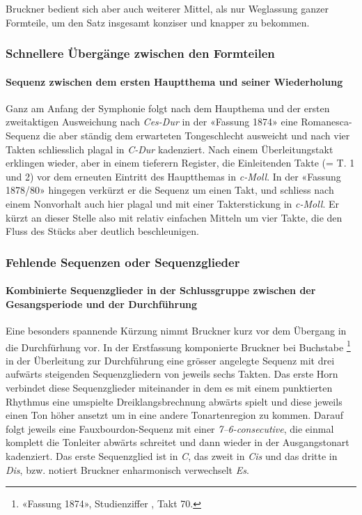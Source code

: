 Bruckner bedient sich aber auch weiterer Mittel, als nur Weglassung ganzer Formteile, um den Satz insgesamt konziser und knapper zu bekommen.

\subsubsection{Schnellere Übergänge zwischen den Formteilen}

\paragraph{Sequenz zwischen dem ersten Hauptthema und seiner Wiederholung}

Ganz am Anfang der Symphonie folgt nach dem Haupthema und der ersten zweitaktigen Ausweichung nach \emph{Ces-Dur} in der «Fassung 1874» eine Romanesca-Sequenz die aber ständig dem erwarteten Tongeschlecht ausweicht und nach vier Takten schliesslich plagal in \emph{C-Dur} kadenziert.
Nach einem Überleitungstakt erklingen wieder, aber in einem tieferern Register, die Einleitenden Takte (= T. 1 und 2) vor dem erneuten Eintritt des Hauptthemas in \emph{c-Moll}.
In der «Fassung 1878/80» hingegen verkürzt er die Sequenz um einen Takt, und schliess nach einem Nonvorhalt auch hier plagal und mit einer Takterstickung in \emph{c-Moll}.
Er kürzt an dieser Stelle also mit relativ einfachen Mitteln um vier Takte, die den Fluss des Stücks aber deutlich beschleunigen.


\subsubsection{Fehlende Sequenzen oder Sequenzglieder}


\paragraph{Kombinierte Sequenzglieder in der Schlussgruppe zwischen der Gesangsperiode und der Durchführung}

Eine besonders spannende Kürzung nimmt Bruckner kurz vor dem Übergang in die Durchfürhung vor.
In der Erstfassung komponierte Bruckner bei Buchstabe \footnote{«Fassung 1874», Studienziffer , Takt 70.} in der Überleitung zur Durchführung eine grösser angelegte Sequenz mit drei aufwärts steigenden Sequenzgliedern von jeweils sechs Takten.
Das erste Horn verbindet diese Sequenzglieder miteinander in dem es mit einem punktierten Rhythmus eine umspielte Dreiklangsbrechnung abwärts spielt und diese jeweils einen Ton höher ansetzt um in eine andere Tonartenregion zu kommen.
Darauf folgt jeweils eine Fauxbourdon-Sequenz mit einer \emph{7--6-consecutive}, die einmal komplett die Tonleiter abwärts schreitet und dann wieder in der Ausgangstonart kadenziert.
Das erste Sequenzglied ist in \emph{C}, das zweit in \emph{Cis} und das dritte in \emph{Dis}, bzw. notiert Bruckner enharmonisch verwechselt \emph{Es}.

